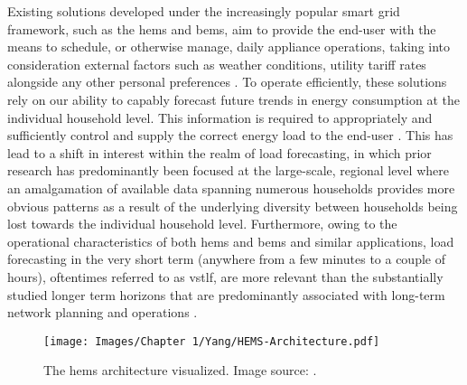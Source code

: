 \noindent \newline Existing solutions developed under the increasingly popular smart grid framework, such as the \gls{hems} and \gls{bems}, aim to provide the end-user with the means to schedule, or otherwise manage, daily appliance operations, taking into consideration external factors such as weather conditions, utility tariff rates alongside any other personal preferences \cite{Yildiz}. To operate efficiently, these solutions rely on our ability to capably forecast future trends in energy consumption at the individual household level. This information is required to appropriately and sufficiently control and supply the correct energy load to the end-user \cite{Raza, Kareem}. This has lead to a shift in interest within the realm of load forecasting, in which prior research has predominantly been focused at the large-scale, regional level \cite{Foucquier} where an amalgamation of available data spanning numerous households provides more obvious patterns as a result of the underlying diversity between households being lost \cite{Kong} towards the individual household level. Furthermore, owing to the operational characteristics of both \gls{hems} and \gls{bems} and similar applications, load forecasting in the very short term (anywhere from a few minutes to a couple of hours), oftentimes referred to as \gls{vstlf}, are more relevant than the substantially studied longer term horizons that are predominantly associated with long-term network planning and operations \cite{Yildiz}.

\begin{figure}[hbt!]
    \centering
    \texttt{[image: Images/Chapter 1/Yang/HEMS-Architecture.pdf]}
    \caption{The \gls{hems} architecture visualized. Image source: \cite{Yang} .}
    \label{fig:HEMS-Architecture}
\end{figure}

